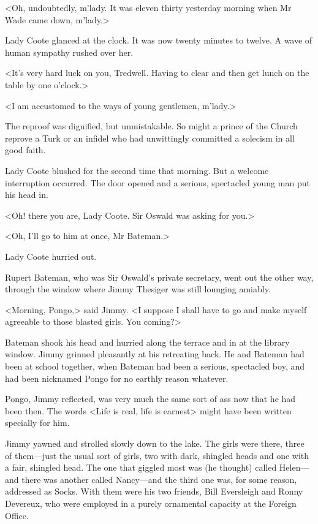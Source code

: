 <Oh, undoubtedly, m'lady. It was eleven thirty yesterday morning when Mr Wade came down, m'lady.>

Lady Coote glanced at the clock. It was now twenty minutes to twelve. A wave of human sympathy rushed over her.

<It's very hard luck on you, Tredwell. Having to clear and then get lunch on the table by one o'clock.>

<I am accustomed to the ways of young gentlemen, m'lady.>

The reproof was dignified, but unmistakable. So might a prince of the Church reprove a Turk or an infidel who had unwittingly committed a solecism in all good faith.

Lady Coote blushed for the second time that morning. But a welcome interruption occurred. The door opened and a serious, spectacled young man put his head in.

<Oh! there you are, Lady Coote. Sir Oswald was asking for you.>

<Oh, I'll go to him at once, Mr Bateman.>

Lady Coote hurried out.

Rupert Bateman, who was Sir Oswald's private secretary, went out the other way, through the window where Jimmy Thesiger was still lounging amiably.

<Morning, Pongo,> said Jimmy. <I suppose I shall have to go and make myself agreeable to those blasted girls. You coming?>

Bateman shook his head and hurried along the terrace and in at the library window. Jimmy grinned pleasantly at his retreating back. He and Bateman had been at school together, when Bateman had been a serious, spectacled boy, and had been nicknamed Pongo for no earthly reason whatever.

Pongo, Jimmy reflected, was very much the same sort of ass now that he had been then. The words <Life is real, life is earnest> might have been written specially for him.

Jimmy yawned and strolled slowly down to the lake. The girls were there, three of them—just the usual sort of girls, two with dark, shingled heads and one with a fair, shingled head. The one that giggled most was (he thought) called Helen—and there was another called Nancy—and the third one was, for some reason, addressed as Socks. With them were his two friends, Bill Eversleigh and Ronny Devereux, who were employed in a purely ornamental capacity at the Foreign Office.

